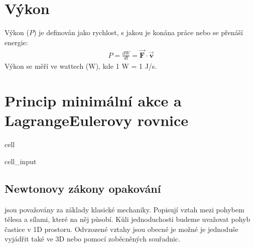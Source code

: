 \documentclass[letterpaper,10pt,english]{jupyterBook}
\begin{document}
\section{Výkon}
\label{\detokenize{Prednasky/1_4_Energie:vykon}}
\sphinxAtStartPar
Výkon (\(P\)) je definován jako rychlost, s jakou je konána práce nebo se přenáší energie:
\begin{equation*}
\begin{split}P = \frac{dW}{dt} = \vec{\mathbf{F}} \cdot \vec{\mathbf{v}}\end{split}
\end{equation*}
\sphinxAtStartPar
Výkon se měří ve wattech (W), kde 1 W = 1 J/s.

\sphinxstepscope


\section{Princip minimální akce a Lagrange\sphinxhyphen{}Eulerovy rovnice}
\label{\detokenize{Prednasky/1_5_Lagrange_Eulerovy_rovnice:princip-minimalni-akce-a-lagrange-eulerovy-rovnice}}\label{\detokenize{Prednasky/1_5_Lagrange_Eulerovy_rovnice::doc}}
\begin{sphinxuseclass}{cell}\begin{sphinxVerbatimInput}

\begin{sphinxuseclass}{cell_input}
\begin{sphinxVerbatim}[commandchars=\\\{\}]
   
   
 
 

   
   
   
\end{sphinxVerbatim}

\end{sphinxuseclass}\end{sphinxVerbatimInput}

\end{sphinxuseclass}

\subsection{Newtonovy zákony \sphinxhyphen{} opakování}
\label{\detokenize{Prednasky/1_5_Lagrange_Eulerovy_rovnice:newtonovy-zakony-opakovani}}
\sphinxAtStartPar
{} jsou považovány za základy klasické mechaniky. Popisují vztah mezi pohybem tělesa a sílami, které na něj působí. Kůli jednoduchosti budeme uvažovat pohyb častice v 1D prostoru. Odvzozené vztahy jsou obecné je možné je jednoduše vyjádřit také ve 3D nebo pomocí zoběcněných souřadnic.
\end{document}
